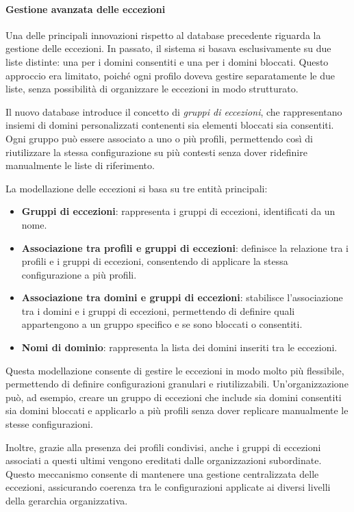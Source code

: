 \paragraph{Gestione avanzata delle eccezioni}
Una delle principali innovazioni rispetto al database precedente riguarda la gestione delle eccezioni. In passato, il sistema si basava esclusivamente su due liste distinte: una per i domini consentiti e una per i domini bloccati. Questo approccio era limitato, poiché ogni profilo doveva gestire separatamente le due liste, senza possibilità di organizzare le eccezioni in modo strutturato.

Il nuovo database introduce il concetto di \emph{gruppi di eccezioni}, che rappresentano insiemi di domini personalizzati contenenti sia elementi bloccati sia consentiti. Ogni gruppo può essere associato a uno o più profili, permettendo così di riutilizzare la stessa configurazione su più contesti senza dover ridefinire manualmente le liste di riferimento.

La modellazione delle eccezioni si basa su tre entità principali:
\begin{itemize}
  \item \textbf{Gruppi di eccezioni}: rappresenta i gruppi di eccezioni, identificati da un nome.
  \item \textbf{Associazione tra profili e gruppi di eccezioni}: definisce la relazione tra i profili e i gruppi di eccezioni, consentendo di applicare la stessa configurazione a più profili.
  \item \textbf{Associazione tra domini e gruppi di eccezioni}: stabilisce l'associazione tra i domini e i gruppi di eccezioni, permettendo di definire quali appartengono a un gruppo specifico e se sono bloccati o consentiti.
  \item \textbf{Nomi di dominio}: rappresenta la lista dei domini inseriti tra le eccezioni.
\end{itemize}

Questa modellazione consente di gestire le eccezioni in modo molto più flessibile, permettendo di definire configurazioni granulari e riutilizzabili. Un’organizzazione può, ad esempio, creare un gruppo di eccezioni che include sia domini consentiti sia domini bloccati e applicarlo a più profili senza dover replicare manualmente le stesse configurazioni.

Inoltre, grazie alla presenza dei profili condivisi, anche i gruppi di eccezioni associati a questi ultimi vengono ereditati dalle organizzazioni subordinate. Questo meccanismo consente di mantenere una gestione centralizzata delle eccezioni, assicurando coerenza tra le configurazioni applicate ai diversi livelli della gerarchia organizzativa.

